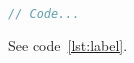 \begin{lstlisting}[caption={Some C code},label={lst:label},language=C]
// Code...
\end{lstlisting}
See code~\ref{lst:label}.